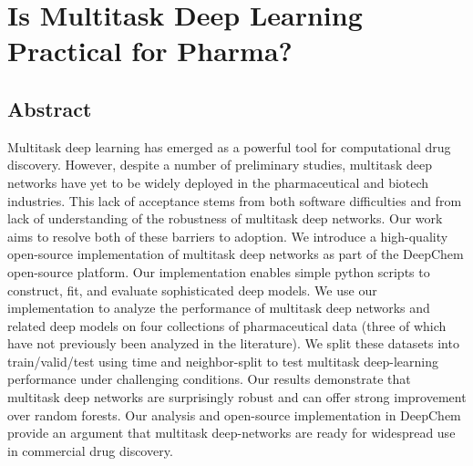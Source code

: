 \section{Is Multitask Deep Learning Practical for Pharma?}

\subsection{Abstract}
Multitask deep learning has emerged as a powerful tool for computational drug discovery. However, despite a number of preliminary studies, multitask deep networks have yet to be widely deployed in the pharmaceutical and biotech industries. This lack of acceptance stems from both software difficulties and from lack of understanding of the robustness of multitask deep networks. Our work aims to resolve both of these barriers to adoption. We introduce a high-quality open-source implementation of multitask deep networks as part of the DeepChem open-source platform. Our implementation enables simple python scripts to construct, fit, and evaluate sophisticated deep models. We use our implementation to analyze the performance of multitask deep networks and related deep models on four collections of pharmaceutical data (three of which have not previously been analyzed in the literature). We split these datasets into train/valid/test using time and neighbor-split to test multitask deep-learning performance under challenging conditions. Our results demonstrate that multitask deep networks are surprisingly robust and can offer strong improvement over random forests. Our analysis and open-source implementation in DeepChem provide an argument that multitask deep-networks are ready for widespread use in commercial drug discovery. 


